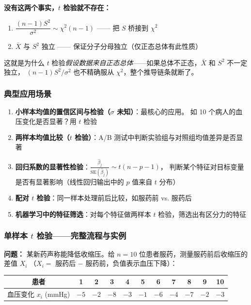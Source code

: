 \textbf{没有这两个事实，$t$ 检验就不存在：}
\begin{enumerate}[label=(\arabic*)]
    \item $\dfrac{(n-1)S^2}{\sigma^2} \sim \chi^2(n-1)$ —— 把 $S$ 桥接到 $\chi^2$
    \item $\bar{X}$ 与 $S^2$ 独立 —— 保证分子分母独立（仅正态总体有此性质）
\end{enumerate}

这就是为什么 $t$ 检验\emph{假设数据来自正态总体}——如果总体不正态，$\bar{X}$ 和 $S^2$ 不一定独立，
$(n-1)S^2/\sigma^2$ 也不精确服从 $\chi^2$，整个推导链条就断了。

\subsubsection{典型应用场景}

\begin{enumerate}[label=(\arabic*)]
    \item \textbf{小样本均值的置信区间与检验（$\sigma$ 未知）}：最核心的应用。
    如 10 个病人的血压变化是否显著？用 $t$ 检验
    \item \textbf{两样本均值比较（$t$ 检验）}：A/B 测试中判断实验组与对照组均值差异是否显著
    \item \textbf{回归系数的显著性检验}：$\frac{\hat{\beta}_j}{\mathrm{SE}(\hat{\beta}_j)} \sim t(n-p-1)$，
    判断某个特征对目标变量是否有显著影响（线性回归输出中的 $p$ 值来自 $t$ 分布）
    \item \textbf{配对 $t$ 检验}：同一样本处理前后比较，如服药前 vs. 服药后
    \item \textbf{机器学习中的特征筛选}：对每个特征做两样本 $t$ 检验，筛选出有区分力的特征
\end{enumerate}

\subsubsection{单样本 $t$ 检验——完整流程与实例}

\textbf{问题：} 某新药声称能降低收缩压。给 $n = 10$ 位患者服药，测量服药前后收缩压的差值 $X_i$
（$X_i =$ 服药后 $-$ 服药前，负值表示血压下降）：

\begin{center}
\begin{tabular}{c|cccccccccc}
\toprule
患者 & 1 & 2 & 3 & 4 & 5 & 6 & 7 & 8 & 9 & 10 \\
\midrule
血压变化 $x_i$ (mmHg) & $-5$ & $-2$ & $-8$ & $-3$ & $-1$ & $-6$ & $-4$ & $-7$ & $-2$ & $-3$ \\
\bottomrule
\end{tabular}
\end{center}


